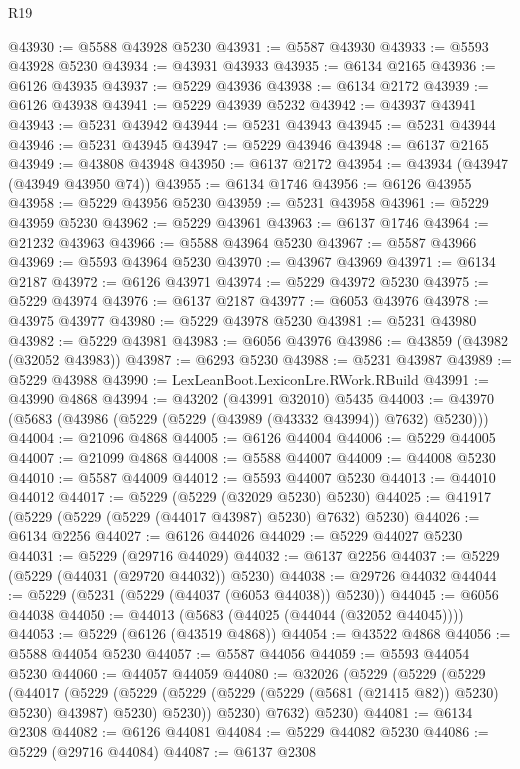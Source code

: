 \begin{lexlean}{R19}
\begin{coremodule}
@43930 := @5588 @43928 @5230
@43931 := @5587 @43930
@43933 := @5593 @43928 @5230
@43934 := @43931 @43933
@43935 := @6134 @2165
@43936 := @6126 @43935
@43937 := @5229 @43936
@43938 := @6134 @2172
@43939 := @6126 @43938
@43941 := @5229 @43939 @5232
@43942 := @43937 @43941
@43943 := @5231 @43942
@43944 := @5231 @43943
@43945 := @5231 @43944
@43946 := @5231 @43945
@43947 := @5229 @43946
@43948 := @6137 @2165
@43949 := @43808 @43948
@43950 := @6137 @2172
@43954 := @43934 (@43947 (@43949 @43950 @74))
@43955 := @6134 @1746
@43956 := @6126 @43955
@43958 := @5229 @43956 @5230
@43959 := @5231 @43958
@43961 := @5229 @43959 @5230
@43962 := @5229 @43961
@43963 := @6137 @1746
@43964 := @21232 @43963
@43966 := @5588 @43964 @5230
@43967 := @5587 @43966
@43969 := @5593 @43964 @5230
@43970 := @43967 @43969
@43971 := @6134 @2187
@43972 := @6126 @43971
@43974 := @5229 @43972 @5230
@43975 := @5229 @43974
@43976 := @6137 @2187
@43977 := @6053 @43976
@43978 := @43975 @43977
@43980 := @5229 @43978 @5230
@43981 := @5231 @43980
@43982 := @5229 @43981
@43983 := @6056 @43976
@43986 := @43859 (@43982 (@32052 @43983))
@43987 := @6293 @5230
@43988 := @5231 @43987
@43989 := @5229 @43988
@43990 := LexLeanBoot.LexiconLre.RWork.RBuild
@43991 := @43990 @4868
@43994 := @43202 (@43991 @32010) @5435
@44003 := @43970 (@5683 (@43986 (@5229 (@5229 (@43989 (@43332 @43994)) @7632) @5230)))
@44004 := @21096 @4868
@44005 := @6126 @44004
@44006 := @5229 @44005
@44007 := @21099 @4868
@44008 := @5588 @44007
@44009 := @44008 @5230
@44010 := @5587 @44009
@44012 := @5593 @44007 @5230
@44013 := @44010 @44012
@44017 := @5229 (@5229 (@32029 @5230) @5230)
@44025 := @41917 (@5229 (@5229 (@5229 (@44017 @43987) @5230) @7632) @5230)
@44026 := @6134 @2256
@44027 := @6126 @44026
@44029 := @5229 @44027 @5230
@44031 := @5229 (@29716 @44029)
@44032 := @6137 @2256
@44037 := @5229 (@5229 (@44031 (@29720 @44032)) @5230)
@44038 := @29726 @44032
@44044 := @5229 (@5231 (@5229 (@44037 (@6053 @44038)) @5230))
@44045 := @6056 @44038
@44050 := @44013 (@5683 (@44025 (@44044 (@32052 @44045))))
@44053 := @5229 (@6126 (@43519 @4868))
@44054 := @43522 @4868
@44056 := @5588 @44054 @5230
@44057 := @5587 @44056
@44059 := @5593 @44054 @5230
@44060 := @44057 @44059
@44080 := @32026
    (@5229
      (@5229
        (@5229
          (@44017
            (@5229
              (@5229 (@5229 (@5229 (@5229 (@5681 (@21415 @82)) @5230) @5230) @43987) @5230)
              @5230))
          @5230)
        @7632)
      @5230)
@44081 := @6134 @2308
@44082 := @6126 @44081
@44084 := @5229 @44082 @5230
@44086 := @5229 (@29716 @44084)
@44087 := @6137 @2308

\end{coremodule}
\end{lexlean}
